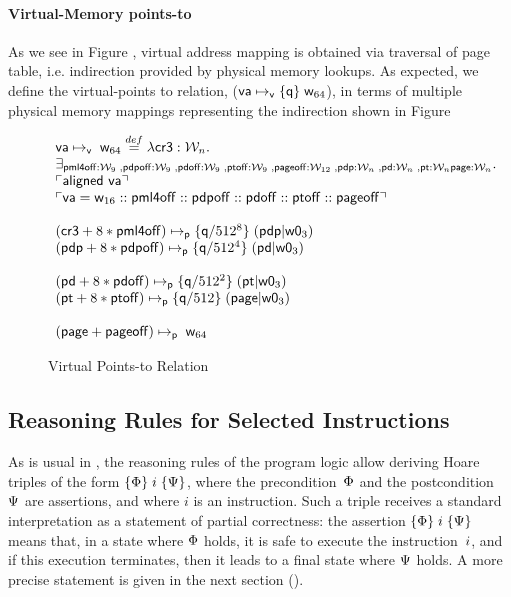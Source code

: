 \paragraph{Virtual-Memory points-to} As we see in Figure , virtual address mapping is obtained via traversal of page table, i.e. indirection provided by physical memory lookups. As expected, we define the virtual-points to relation, ($\mathsf{va}\mapsto_{\mathsf{v}}\{\mathsf{q}\}\;\mathsf{w}_{64}$), in terms of multiple physical memory mappings representing the indirection shown in Figure 
\begin{figure*}
\[
\begin{array}{l}
  \mathsf{va}\mapsto_{\mathsf{v}}\;\mathsf{w}_{64} \stackrel{def}{=} \lambda \mathsf{cr3}:\mathcal{W}_n.\\
  \exists_{\mathsf{pml4off}:\mathcal{W}_{9} \;, \mathsf{pdpoff}:\mathcal{W}_{9} \;, \mathsf{pdoff}:\mathcal{W}_{9} \;,\mathsf{ptoff}:\mathcal{W}_{9} \;, \mathsf{pageoff}:\mathcal{W}_{12} \;, \mathsf{pdp}:\mathcal{W}_n \;, \mathsf{pd}:\mathcal{W}_n \;, \mathsf{pt}:\mathcal{W}_n \mathsf{page}:\mathcal{W}_n} \ldotp \\
  \ulcorner \textsf{aligned } \mathsf{va} \urcorner \\ 
   \ulcorner \mathsf{va} = \mathsf{w}_{16} :: \mathsf{pml4off} :: \mathsf{pdpoff} :: 
   \mathsf{pdoff} :: \mathsf{ptoff} :: \mathsf{pageoff} \urcorner \\\\
  (\mathsf{cr3}+8*\mathsf{pml4off})\mapsto_{\mathsf{p}}\{\mathsf{q}/512^{8}\}\;(\mathsf{pdp} | \mathsf{w0}_{3}) \\ 
  (\mathsf{pdp}+8*\mathsf{pdpoff})\mapsto_{\mathsf{p}}\{\mathsf{q}/512^{4}\}\;(\mathsf{pd} | \mathsf{w0}_{3}) \\ \\
  (\mathsf{pd}+8*\mathsf{pdoff})\mapsto_{\mathsf{p}}\{\mathsf{q}/512^{2}\}\;(\mathsf{pt} | \mathsf{w0}_{3}) \\ 
  (\mathsf{pt}+8*\mathsf{ptoff})\mapsto_{\mathsf{p}}\{\mathsf{q}/512\}\;(\mathsf{page} | \mathsf{w0}_{3}) \\ \\
  (\mathsf{page}+\mathsf{pageoff})\mapsto_{\mathsf{p}}\;\mathsf{w}_{64} 
\end{array}
\]
\caption{Virtual Points-to Relation}
  \label{fig:virtualpointsto}
\end{figure*}
\subsection{Reasoning Rules for Selected Instructions}
\label{sec:reasoning}

As is usual in \SL, the reasoning rules of the program logic allow deriving
Hoare triples of the form $\{\Phi\}\;i\;\{\Psi\}$, where the
precondition~$\Phi$ and the postcondition~$\Psi$ are assertions,
and where $i$ is an instruction.
Such a triple receives a standard interpretation as a statement of partial
correctness: the assertion $\{\Phi\}\;i\;\{\Psi\}$ means that, in a state
where $\Phi$ holds, it is safe to execute the instruction~$i$, and if
this execution terminates, then it leads to a final state where $\Psi$ holds.
A more precise statement is given in the next section ().
